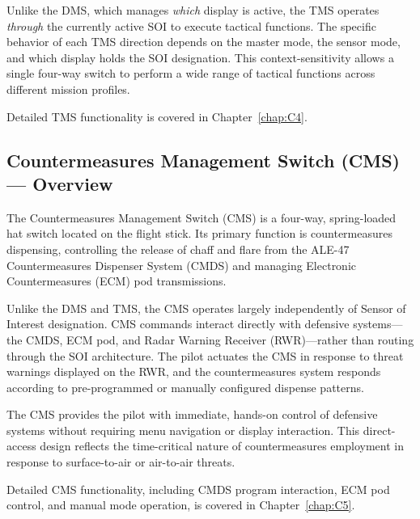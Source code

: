 \documentclass[11pt, a4paper, twoside]{report}
\begin{document}
Unlike the DMS, which manages \textit{which} display is active, the TMS operates \textit{through} the currently active SOI to execute tactical functions. The specific behavior of each TMS direction depends on the master mode, the sensor mode, and which display holds the SOI designation. This context-sensitivity allows a single four-way switch to perform a wide range of tactical functions across different mission profiles.

Detailed TMS functionality is covered in Chapter~\ref{chap:C4}.


\subsection{Countermeasures Management Switch (CMS) — Overview}
\label{sec:C2-S3-S3}

The Countermeasures Management Switch (CMS) is a four-way, spring-loaded hat switch located on the flight stick. Its primary function is countermeasures dispensing, controlling the release of chaff and flare from the ALE-47 Countermeasures Dispenser System (CMDS) and managing Electronic Countermeasures (ECM) pod transmissions.

Unlike the DMS and TMS, the CMS operates largely independently of Sensor of Interest designation. CMS commands interact directly with defensive systems—the CMDS, ECM pod, and Radar Warning Receiver (RWR)—rather than routing through the SOI architecture. The pilot actuates the CMS in response to threat warnings displayed on the RWR, and the countermeasures system responds according to pre-programmed or manually configured dispense patterns.

The CMS provides the pilot with immediate, hands-on control of defensive systems without requiring menu navigation or display interaction. This direct-access design reflects the time-critical nature of countermeasures employment in response to surface-to-air or air-to-air threats.

Detailed CMS functionality, including CMDS program interaction, ECM pod control, and manual mode operation, is covered in Chapter~\ref{chap:C5}.

\end{document}
